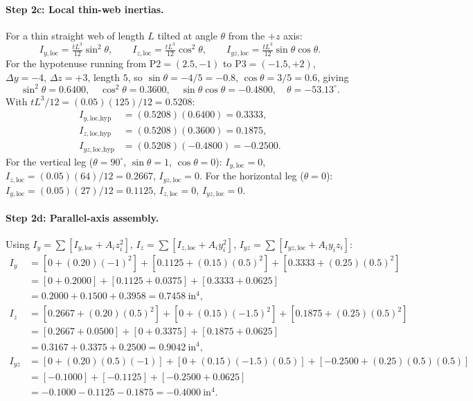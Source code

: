 \documentclass[11pt]{article}
\begin{document}
\paragraph{Step 2c: Local thin-web inertias.} For a thin straight web of length $L$ tilted at angle $\theta$ from the $+z$ axis:
\[
I_{y,\text{loc}} = \tfrac{tL^3}{12}\sin^2\theta,\qquad I_{z,\text{loc}} = \tfrac{tL^3}{12}\cos^2\theta,\qquad I_{yz,\text{loc}} = \tfrac{tL^3}{12}\sin\theta\cos\theta.
\]
For the hypotenuse running from P2$=(2.5,-1)$ to P3$=(-1.5,+2)$, $\Delta y = -4$, $\Delta z = +3$, length $5$, so $\sin\theta = -4/5 = -0.8$, $\cos\theta = 3/5 = 0.6$, giving
\[
\sin^2\theta = 0.6400,\quad \cos^2\theta = 0.3600,\quad \sin\theta\cos\theta = -0.4800,\quad \theta = -53.13^\circ.
\]
With $tL^3/12 = (0.05)(125)/12 = 0.5208$:
\begin{align*}
I_{y,\text{loc,hyp}} &= (0.5208)(0.6400) = 0.3333,\\
I_{z,\text{loc,hyp}} &= (0.5208)(0.3600) = 0.1875,\\
I_{yz,\text{loc,hyp}} &= (0.5208)(-0.4800) = -0.2500.
\end{align*}
For the vertical leg ($\theta = 90^\circ$, $\sin\theta = 1$, $\cos\theta = 0$): $I_{y,\text{loc}} = 0$, $I_{z,\text{loc}} = (0.05)(64)/12 = 0.2667$, $I_{yz,\text{loc}} = 0$. For the horizontal leg ($\theta = 0$): $I_{y,\text{loc}} = (0.05)(27)/12 = 0.1125$, $I_{z,\text{loc}} = 0$, $I_{yz,\text{loc}} = 0$.

\paragraph{Step 2d: Parallel-axis assembly.} Using $I_y = \sum[I_{y,\text{loc}} + A_i z_i^2]$, $I_z = \sum[I_{z,\text{loc}} + A_i y_i^2]$, $I_{yz} = \sum[I_{yz,\text{loc}} + A_i y_i z_i]$:
\begin{align*}
I_y &= [0 + (0.20)(-1)^2] + [0.1125 + (0.15)(0.5)^2] + [0.3333 + (0.25)(0.5)^2]\\
    &= [0 + 0.2000] + [0.1125 + 0.0375] + [0.3333 + 0.0625]\\
    &= 0.2000 + 0.1500 + 0.3958 = 0.7458\ \text{in}^4,\\[2pt]
I_z &= [0.2667 + (0.20)(0.5)^2] + [0 + (0.15)(-1.5)^2] + [0.1875 + (0.25)(0.5)^2]\\
    &= [0.2667 + 0.0500] + [0 + 0.3375] + [0.1875 + 0.0625]\\
    &= 0.3167 + 0.3375 + 0.2500 = 0.9042\ \text{in}^4,\\[2pt]
I_{yz} &= [0 + (0.20)(0.5)(-1)] + [0 + (0.15)(-1.5)(0.5)] + [-0.2500 + (0.25)(0.5)(0.5)]\\
    &= [-0.1000] + [-0.1125] + [-0.2500 + 0.0625]\\
    &= -0.1000 - 0.1125 - 0.1875 = -0.4000\ \text{in}^4.
\end{align*}
\end{document}
